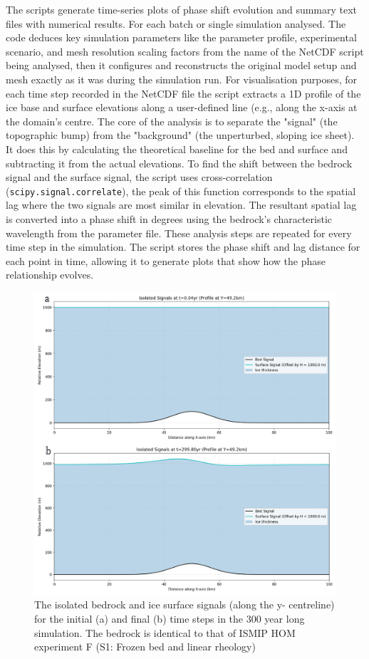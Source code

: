  The scripts generate time-series plots of phase shift evolution and summary text files with numerical results. For each batch or single simulation analysed.
The code deduces key simulation parameters like the parameter profile, experimental scenario, and mesh resolution scaling factors from the name of the NetCDF script being analysed, then it configures and reconstructs the original model setup and mesh exactly as it was during the simulation run.
For visualisation purposes, for each time step recorded in the NetCDF file the script extracts a 1D profile of the ice base and surface elevations along a user-defined line (e.g., along the x-axis at the domain's centre. The core of the analysis is to separate the "signal" (the topographic bump) from the "background" (the unperturbed, sloping ice sheet). It does this by calculating the theoretical baseline for the bed and surface and subtracting it from the actual elevations. To find the shift between the bedrock signal and the surface signal, the script uses cross-correlation (\texttt{scipy.signal.correlate}), the peak of this function corresponds to the spatial lag where the two signals are most similar in elevation.
The resultant spatial lag is converted into a phase shift in degrees using the bedrock's characteristic wavelength from the parameter file. These analysis steps are repeated for every time step in the simulation. The script stores the phase shift and lag distance for each point in time, allowing it to generate plots that show how the phase relationship evolves.

\begin{figure}[H]
    \includegraphics[scale=0.49]{S1_signals.pdf}
    \caption{The isolated bedrock and ice surface signals (along the y- centreline) for the initial (a) and final (b) time steps in the 300 year long simulation. The bedrock is identical to that of ISMIP HOM experiment F (S1: Frozen bed and linear rheology)}
    \label{fig:phase_analysis_Signals}
\end{figure}


